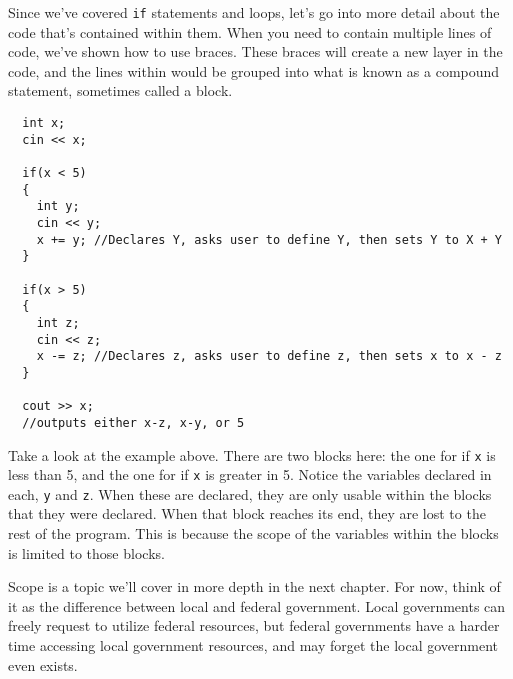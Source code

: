 
Since we've covered \texttt{if} statements and loops, let's go into more detail about the code that's contained within them. When you need to contain multiple lines of code, we've shown how to use braces. These braces will create a new layer in the code, and the lines within would be grouped into what is known as a compound statement, sometimes called a block.

\begin{lstlisting}
  int x;
  cin << x;

  if(x < 5)
  {
    int y;
    cin << y;	
    x += y;	//Declares Y, asks user to define Y, then sets Y to X + Y
  }

  if(x > 5)
  {
    int z;
    cin << z;
    x -= z;	//Declares z, asks user to define z, then sets x to x - z
  }

  cout >> x;
  //outputs either x-z, x-y, or 5
\end{lstlisting}

Take a look at the example above. There are two blocks here: the one for if \texttt{x} is less than 5, and the one for if \texttt{x} is greater in 5. Notice the variables declared in each, \texttt{y} and \texttt{z}. When these are declared, they are only usable within the blocks that they were declared. When that block reaches its end, they are lost to the rest of the program. This is because the scope of the variables within the blocks is limited to those blocks.

Scope is a topic we'll cover in more depth in the next chapter. For now, think of it as the difference between local and federal government. Local governments can freely request to utilize federal resources, but federal governments have a harder time accessing local government resources, and may forget the local government even exists.









